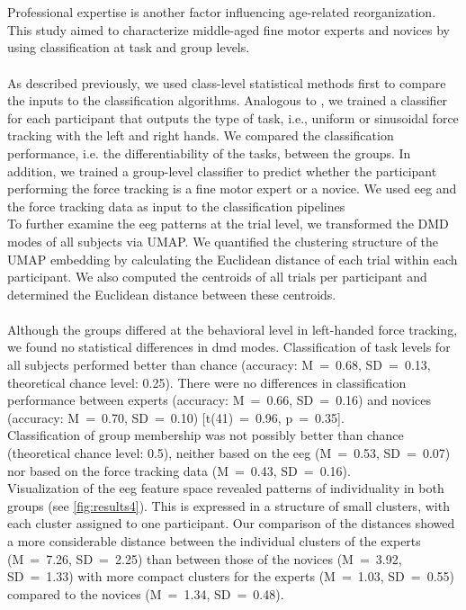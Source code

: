 \hyperref[pub:paperIV]{}\\
\\
Professional expertise is another factor influencing age-related reorganization. This study aimed to characterize middle-aged fine motor experts and novices by using classification at task and group levels.\\
\\
As described previously, we used class-level statistical methods first to compare the inputs to the classification algorithms. Analogous to , we trained a classifier for each participant that outputs the type of task, i.e., uniform or sinusoidal force tracking with the left and right hands. We compared the classification performance, i.e. the differentiability of the tasks, between the groups. In addition, we trained a group-level classifier to predict whether the participant performing the force tracking is a fine motor expert or a novice. We used \gls{eeg} and the force tracking data as input to the classification pipelines\\
To further examine the \gls{eeg} patterns at the trial level, we transformed the DMD modes of all subjects via UMAP. We quantified the clustering structure of the UMAP embedding by calculating the Euclidean distance of each trial within each participant. We also computed the centroids of all trials per participant and determined the Euclidean distance between these centroids.\\
\\
Although the groups differed at the behavioral level in left-handed force tracking, we found no statistical differences in \gls{dmd} modes. Classification of task levels for all subjects performed better than chance (accuracy: M~=~0.68, SD~=~0.13, theoretical chance level: 0.25). There were no differences in classification performance between experts (accuracy: M~=~0.66, SD~=~0.16) and novices (accuracy: M~=~0.70, SD~=~0.10) [t(41)~=~0.96, p~=~0.35].\\
Classification of group membership was not possibly better than chance (theoretical chance level: 0.5), neither based on the \gls{eeg} (M~=~0.53, SD~=~0.07) nor based on the force tracking data (M~=~0.43, SD~=~0.16).\\
Visualization of the \gls{eeg} feature space revealed patterns of individuality in both groups (see \autoref{fig:results4}). This is expressed in a structure of small clusters, with each cluster assigned to one participant. Our comparison of the distances showed a more considerable distance between the individual clusters of the experts (M~=~7.26, SD~=~2.25) than between those of the novices (M~=~3.92, SD~=~1.33) with more compact clusters for the experts (M~=~1.03, SD~=~0.55) compared to the novices (M~=~1.34, SD~=~0.48).\\


